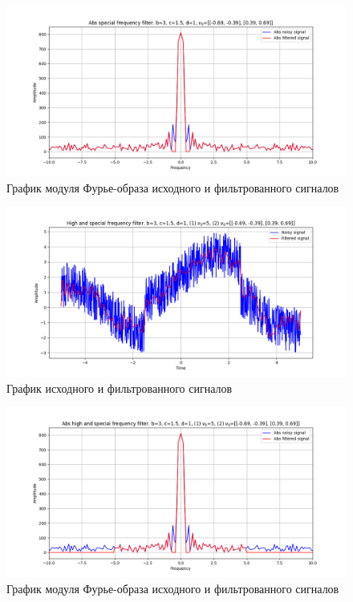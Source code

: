 \documentclass[a4paper, 12pt]{article}
\begin{document}
    \begin{figure}[!htb]
        \centering
        \includegraphics[scale=0.485]{7_1_abs_u_U_nospec.png}
        \captionsetup{skip=0pt}
        \caption{График модуля Фурье-образа исходного и фильтрованного сигналов}
        \label{fig:fig108}
    \end{figure}
    \begin{figure}[!htb]
        \centering
        \includegraphics[scale=0.485]{7_2_u_flt_u_nospec.png}
        \captionsetup{skip=0pt}
        \caption{График исходного и фильтрованного сигналов}
        \label{fig:fig109}
    \end{figure}
    \begin{figure}[!htb]
        \centering
        \includegraphics[scale=0.485]{7_2_abs_u_U_nospec.png}
        \captionsetup{skip=0pt}
        \caption{График модуля Фурье-образа исходного и фильтрованного сигналов}
        \label{fig:fig110}
    \end{figure}
\end{document}

